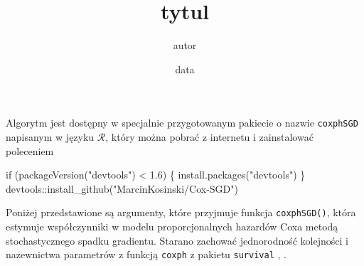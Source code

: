 \documentclass[]{article}
\title{tytul}
\author{autor}
\date{data}
\newenvironment{Shaded}{}{}
\newcommand{\KeywordTok}[1]{\textcolor[rgb]{0.00,0.00,1.00}{{#1}}}
\newcommand{\FloatTok}[1]{{#1}}
\newcommand{\StringTok}[1]{\textcolor[rgb]{0.00,0.50,0.50}{{#1}}}
\newcommand{\NormalTok}[1]{{#1}}
\begin{document}
\maketitle


Algorytm jest dostępny w specjalnie przygotowanym pakiecie o nazwie
\texttt{coxphSGD} napisanym w języku \(\mathcal{R}\), który można pobrać
z internetu i zainstalować poleceniem

\begin{Shaded}
\begin{Highlighting}[]
\NormalTok{if (}\KeywordTok{packageVersion}\NormalTok{(}\StringTok{"devtools"}\NormalTok{) <}\StringTok{ }\FloatTok{1.6}\NormalTok{) \{}
  \KeywordTok{install.packages}\NormalTok{(}\StringTok{"devtools"}\NormalTok{)}
\NormalTok{\}}
\NormalTok{devtools::}\KeywordTok{install_github}\NormalTok{(}\StringTok{"MarcinKosinski/Cox-SGD"}\NormalTok{)}
\end{Highlighting}
\end{Shaded}

Poniżej przedstawione są argumenty, które przyjmuje funkcja
\texttt{coxphSGD()}, która estymuje współczynniki w modelu
proporcjonalnych hazardów Coxa metodą stochastycznego spadku gradientu.
Starano zachować jednorodność kolejności i nazewnictwa parametrów z
funkcją \texttt{coxph} z pakietu \texttt{survival} \cite{ther},
\cite{survival}.
\end{document}
